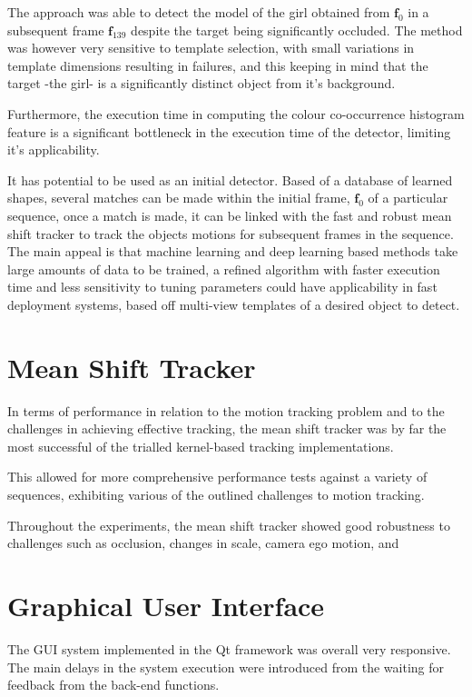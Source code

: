 The approach was able to detect the model of the girl obtained from
$\mathbf{f}_0$ in a subsequent frame $\mathbf{f}_{139}$ despite the target being
significantly occluded. 
The method was however very sensitive to template selection, with small
variations in template dimensions resulting in failures, and this keeping in
mind that the target -the girl- is a significantly distinct object from it's
background. 

Furthermore, the execution time in computing the colour co-occurrence histogram
feature is a significant bottleneck in the execution time of the detector,
limiting it's applicability. 

It has potential to be used as an initial detector. Based of a database of
learned shapes, several matches can be made within the initial frame,
$\mathbf{f}_0$ of a particular sequence, once a match is made, it can be linked
with the fast and robust mean shift tracker to track the objects motions for
subsequent frames in the sequence. The main appeal is that machine learning and
deep learning based methods take large amounts of data to be trained, a
refined algorithm with faster execution time and less sensitivity to tuning
parameters could have applicability in fast deployment systems, based off
multi-view templates of a desired object to detect.

\section{Mean Shift Tracker}
In terms of performance in relation to the motion tracking problem and to the
challenges in achieving effective tracking, the mean shift tracker was by far
the most successful of the trialled kernel-based tracking implementations.

This allowed for more comprehensive performance tests against a variety of
sequences, exhibiting various of the outlined challenges to motion tracking.

Throughout the experiments, the mean shift tracker showed good robustness to
challenges such as occlusion, changes in scale, camera ego motion, and  


\section{Graphical User Interface}
The GUI system implemented in the Qt framework was overall very responsive. The
main delays in the system execution were introduced from the waiting for
feedback from the back-end functions.

